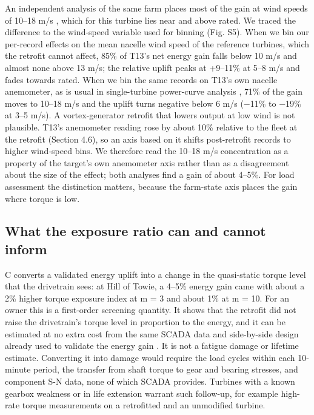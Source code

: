 \documentclass[preprint,12pt]{elsarticle}
\begin{document}
An independent analysis of the same farm places most of the gain at wind speeds of 10--18 m/s \cite{wang}, which for this turbine lies near and above rated. We traced the difference to the wind-speed variable used for binning (Fig. S5). When we bin our per-record effects on the mean nacelle wind speed of the reference turbines, which the retrofit cannot affect, 85\% of T13's net energy gain falls below 10 m/s and almost none above 13 m/s; the relative uplift peaks at +9--11\% at 5--8 m/s and fades towards rated. When we bin the same records on T13's own nacelle anemometer, as is usual in single-turbine power-curve analysis \cite{iec}, 71\% of the gain moves to 10--18 m/s and the uplift turns negative below 6 m/s (−11\% to −19\% at 3--5 m/s). A vortex-generator retrofit that lowers output at low wind is not plausible. T13's anemometer reading rose by about 10\% relative to the fleet at the retrofit (Section 4.6), so an axis based on it shifts post-retrofit records to higher wind-speed bins. We therefore read the 10--18 m/s concentration as a property of the target's own anemometer axis rather than as a disagreement about the size of the effect; both analyses find a gain of about 4--5\%. For load assessment the distinction matters, because the farm-state axis places the gain where torque is low.

\subsection{What the exposure ratio can and cannot inform}

C converts a validated energy uplift into a change in the quasi-static torque level that the drivetrain sees: at Hill of Towie, a 4--5\% energy gain came with about a 2\% higher torque exposure index at m = 3 and about 1\% at m = 10. For an owner this is a first-order screening quantity. It shows that the retrofit did not raise the drivetrain's torque level in proportion to the energy, and it can be estimated at no extra cost from the same SCADA data and side-by-side design already used to validate the energy gain \cite{astolfi18,clerc}. It is not a fatigue damage or lifetime estimate. Converting it into damage would require the load cycles within each 10-minute period, the transfer from shaft torque to gear and bearing stresses, and component S-N data, none of which SCADA provides. Turbines with a known gearbox weakness or in life extension warrant such follow-up, for example high-rate torque measurements on a retrofitted and an unmodified turbine.
\end{document}
